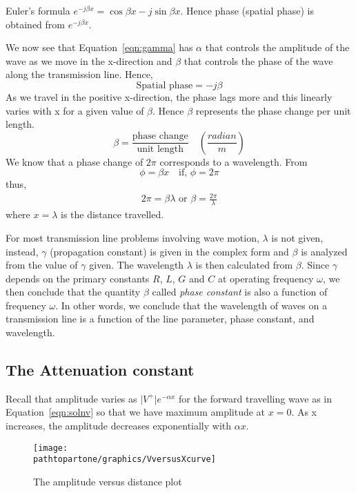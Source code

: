 Euler's formula $e^{-j\beta x} = \cos{\beta x} - j \sin{ \beta x}$. Hence phase (spatial phase) is obtained from $e^{-j\beta x}$.

We now see that Equation~\eqref{eqn:gamma} has $\alpha$ that controls the amplitude of the wave as we move in the x-direction and $\beta$ that controls the phase of the wave along the transmission line. Hence,
\begin{equation}
\text{Spatial phase} = -j\beta
\end{equation}
As we travel in the positive x-direction, the phase lags more and this linearly varies with x for a given value of $\beta$. Hence $\beta$ represents the phase change per unit length.
\begin{equation}
\beta = \frac{\text{phase change}}{\text{unit length}} \quad\left(\frac{radian}{m}\right)
\label{eqn:phaseconstant}
\end{equation}
We know that a phase change of $2\pi$ corresponds to a wavelength. From
\begin{equation*}
\phi = \beta x \quad\text{if, }\phi = 2\pi
\end{equation*}
thus,
\begin{align*}
2\pi = \beta\lambda\text{ or }\beta = \frac{2\pi}{\lambda}
\end{align*}
where $ x = \lambda $ is the distance travelled.

For most transmission line problems involving wave motion, $\lambda$ is not given, instead, $\gamma$ (propagation constant) is given in the complex form and $\beta$ is analyzed from the value of $\gamma$ given. The wavelength $\lambda$ is then calculated from $\beta$. Since $\gamma$ depends on the primary constants $R$, $L$, $G$ and $C$ at operating frequency $\omega$, we then conclude that the quantity $\beta$ called \emph{phase constant} is also a function of frequency $\omega$. In other words, we conclude that the wavelength of waves on a transmission line is a function of the line parameter, phase constant, and wavelength.

\subsection{The Attenuation constant}
Recall that amplitude varies as $\lvert V^+\rvert e^{-\alpha x}$ for the forward travelling wave as in Equation~\eqref{eqn:solnv} so that we have maximum amplitude at $x = 0$. As x increases, the amplitude decreases exponentially with $\alpha x$. 
\begin{figure}[h]
\centering
\texttt{[image: \\pathtopartone/graphics/VversusXcurve]}
\caption{The amplitude versus distance plot}
\label{fig:VversusXcurve}
\end{figure}

